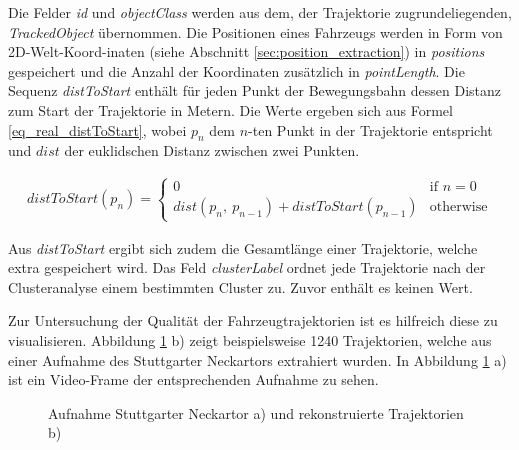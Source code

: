 Die Felder \textit{id} und \textit{objectClass} werden aus dem, der Trajektorie zugrundeliegenden, \textit{TrackedObject}
übernommen.
Die Positionen eines Fahrzeugs werden in Form von 2D-Welt-Koord-inaten (siehe Abschnitt \ref{sec:position_extraction})
in \textit{positions} gespeichert und die Anzahl der Koordinaten zusätzlich in \textit{pointLength}.
Die Sequenz \textit{distToStart} enthält für jeden Punkt der Bewegungsbahn dessen Distanz zum Start der Trajektorie in Metern.
Die Werte ergeben sich aus Formel \ref{eq_real_distToStart}, wobei $p_n$ dem $n$-ten Punkt in der Trajektorie entspricht
und $dist$ der euklidschen Distanz zwischen zwei Punkten.

\begin{ceqn}
\begin{align}
\label{eq_real_distToStart}
    distToStart(p_n) =
    \begin{cases}
        0 & \text{if } n = 0 \\
        dist(p_n,\ p_{n-1}) + distToStart(p_{n-1}) & \text{otherwise}
    \end{cases}
\end{align}
\end{ceqn}

Aus \textit{distToStart} ergibt sich zudem die Gesamtlänge einer Trajektorie, welche extra gespeichert wird.
Das Feld \textit{clusterLabel} ordnet jede Trajektorie nach der Clusteranalyse einem bestimmten Cluster zu.
Zuvor enthält es keinen Wert.

Zur Untersuchung der Qualität der Fahrzeugtrajektorien ist es hilfreich diese zu visualisieren.
Abbildung \ref{fig:real_neckartor} b)
zeigt beispielsweise 1240 Trajektorien, welche aus einer Aufnahme des Stuttgarter Neckartors extrahiert wurden.
In Abbildung \ref{fig:real_neckartor} a) ist ein Video-Frame der entsprechenden Aufnahme zu sehen.

\begin{figure}[H]
    \centering
    \caption[Stuttgarter Neckartor und rekonstruierte Trajektorien]{Aufnahme Stuttgarter Neckartor a) und rekonstruierte Trajektorien b)}
    \label{fig:real_neckartor}
\end{figure}

